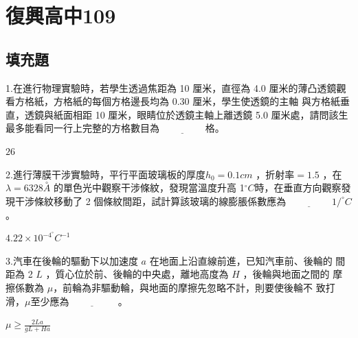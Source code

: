 \documentclass[cn,10pt,math=newtx]{elegantbook}
\begin{document}
\newpage


\chapter{復興高中109}
\section{填充題}

\begin{example}
   1.在進行物理實驗時，若學生透過焦距為 10 厘米，直徑為 4.0 厘米的薄凸透鏡觀看方格紙，方格紙的每個方格邊長均為 0.30 厘米，學生使透鏡的主軸
與方格紙垂直，透鏡與紙面相距 10 厘米，眼睛位於透鏡主軸上離透鏡 5.0
厘米處，請問該生最多能看同一行上完整的方格數目為$\underline{\hspace{2cm}}$格。\\
    \rightline{[復興高中教甄109]}
\end{example}
\begin{solution}
    $26$
\end{solution}

\newpage


\begin{example}
   2.進行薄膜干涉實驗時，平行平面玻璃板的厚度$ℎ_0= 0.1cm$ ，折射率$=1.5$ ，在
$\lambda = 6328 \overset{\circ}{A}$ 的單色光中觀察干涉條紋，發現當溫度升高 1$^\circ C$時，在垂直方向觀察發現干涉條紋移動了 2 個條紋間距，試計算該玻璃的線膨脹係數應為$\underline{\hspace{2cm}} 1/^\circ C$。\\
    \rightline{[復興高中教甄109]}
\end{example}
\begin{solution}
    $4.22\times10^{-4} ^\circ C^{-1}$
\end{solution}

\newpage


\begin{example}
   3.汽車在後輪的驅動下以加速度 $a$ 在地面上沿直線前進，已知汽車前、後輪的
間距為 2 $L$ ，質心位於前、後輪的中央處，離地高度為 $H$ ，後輪與地面之間的
摩擦係數為 $\mu$，前輪為非驅動輪，與地面的摩擦先忽略不計，則要使後輪不
致打滑，$\mu$至少應為$\underline{\hspace{2cm}}$ 。\\
    \rightline{[復興高中教甄109]}
\end{example}
\begin{solution}
    $\mu \ge \frac{2La}{gL+Ha}$
\end{solution}
\end{document}
